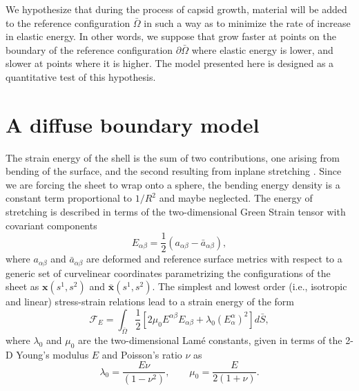 \documentclass[
pre,
 twocolumn,
amsmath,
amssymb
]{revtex4}
\begin{document}
We hypothesize that during the process of capsid growth, material will be added to the reference configuration $\bar{\Omega}$ in such a way as to minimize the rate of increase in elastic energy.  In other words, we suppose that grow faster at points on the boundary of the reference configuration $\partial\bar{\Omega}$ where elastic energy is lower, and slower at points where it is higher.  The model presented here is designed as a quantitative test of this hypothesis.


\section{A diffuse boundary model}
The strain energy of the shell is the sum of two
contributions, one arising from bending of the surface, and the second
resulting from inplane stretching \citep{LandauLifshitz,Timoshenko}.  Since we are forcing the sheet to wrap onto a sphere, the bending energy density is a constant term proportional to $1/R^2$ and maybe neglected.
%
The energy of stretching is described in terms of the two-dimensional
Green Strain tensor with covariant components
\begin{equation}
E_{\alpha\beta} = \frac{1}{2}(a_{\alpha\beta} -
\bar{a}_{\alpha\beta}) ,
\end{equation}
where $a_{\alpha\beta}$ and $\bar{a}_{\alpha\beta}$ are deformed and reference surface metrics with respect to a generic set of curvelinear coordinates parametrizing the configurations of the sheet as $\bm{x}(s^1,s^2)$ and $\bar{\bm{x}}(s^1,s^2)$.  The simplest and lowest order (i.e.,
isotropic and linear) stress-strain relations lead to a strain energy
of the form
\begin{equation}\label{eq:strainEnergy}
\mathcal{F}_E = \int_{\bar{\Omega}} \frac{1}{2}%
  \left[
    2\mu_0 E^{\alpha\beta}E_{\alpha\beta} + \lambda_0 (E^\alpha_\alpha)^2
  \right]
  d\bar{S} ,
\end{equation}
where $\lambda_0$ and $\mu_0$ are the two-dimensional Lam\'e constants,
given in terms of the 2-D Young's modulus $E$ and Poisson's ratio
$\nu$ as
\[
\lambda_0 = \frac{E\nu}{(1-\nu^2)} , \qquad \mu_0 = \frac{E}{2(1+\nu)} .
\]
%
\end{document}
